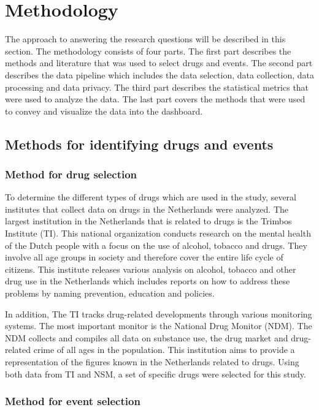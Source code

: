 \section {Methodology}

The approach to answering the research questions will be described in this section. The methodology consists of four parts. The first part describes the methods and literature that was used to select drugs and events. The second part describes the data pipeline which includes the data selection, data collection, data processing and data privacy. The third part describes the statistical metrics that were used to analyze the data. The last part covers the methods that were used to convey and visualize the data into the dashboard. 

\subsection {Methods for identifying drugs and events}

\subsubsection {Method for drug selection}

To determine the different types of drugs which are used in the study, several institutes that collect data on drugs in the Netherlands were analyzed. The largest institution in the Netherlands that is related to drugs is the Trimbos Institute (TI). This national organization conducts research on the mental health of the Dutch people with a focus on the use of alcohol, tobacco and drugs. They involve all age groups in society and therefore cover the entire life cycle of citizens. This institute releases various analysis on alcohol, tobacco and other drug use in the Netherlands which includes reports on how to address these problems by naming prevention, education and policies. 

In addition, The TI tracks drug-related developments through various monitoring systems. The most important monitor is the National Drug Monitor (NDM). The NDM collects and compiles all data on substance use, the drug market and drug-related crime of all ages in the population. This institution aims to provide a representation of the figures known in the Netherlands related to drugs. Using both data from TI and NSM, a set of specific drugs were selected for this study. 


\subsubsection {Method for event selection}

